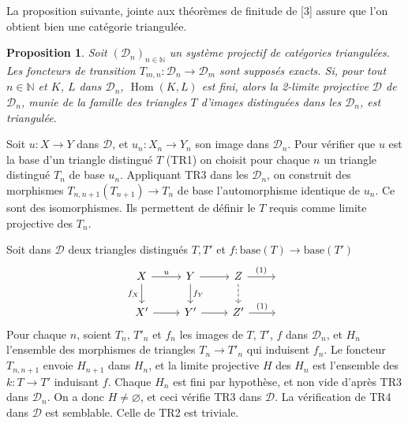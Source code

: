 \documentclass[12pt,a4paper]{article}
\theoremstyle{plain}
\newtheorem{proposition}[theorem]{Proposition}
\theoremstyle{definition}
\DeclareMathOperator{\Hom}{Hom}
\begin{document}
La proposition suivante, jointe aux th\'eor\`emes de finitude de [3] assure que l'on obtient bien une cat\'egorie triangul\'ee.

\begin{proposition}\label{prop:2.2.15}
Soit $(\mathcal{D}_n)_{n \in \mathbb{N}}$ un syst\`eme projectif de cat\'egories triangul\'ees. Les foncteurs de transition $T_{m,n} : \mathcal{D}_n \to \mathcal{D}_m$ sont suppos\'es exacts. Si, pour tout $n \in \mathbb{N}$ et $K$, $L$ dans $\mathcal{D}_n$, $\Hom(K,L)$ est fini, alors la 2-limite projective $\mathcal{D}$ de $\mathcal{D}_n$, munie de la famille des triangles $T$ d'images distingu\'ees dans les $\mathcal{D}_n$, est triangul\'ee.
\end{proposition}

Soit $u : X \to Y$ dans $\mathcal{D}$, et $u_n : X_n \to Y_n$ son image dans $\mathcal{D}_n$. Pour v\'erifier que $u$ est la base d'un triangle distingu\'e $T$ (TR1) on choisit pour chaque $n$ un triangle distingu\'e $T_n$ de base $u_n$. Appliquant TR3 dans les $\mathcal{D}_n$, on construit des morphismes $T_{n,n+1}(T_{n+1}) \to T_n$ de base l'automorphisme identique de $u_n$. Ce sont des isomorphismes. Ils permettent de d\'efinir le $T$ requis comme limite projective des $T_n$.

Soit dans $\mathcal{D}$ deux triangles distingu\'es $T, T'$ et $f : \text{base}(T) \to \text{base}(T')$
\[
\begin{tikzcd}
X \arrow[r, "u"] \arrow[d, "f_X"'] & Y \arrow[r] \arrow[d, "f_Y"] & Z \arrow[r, "{(1)}"] \arrow[d, dashed] & {} \\
X' \arrow[r] & Y' \arrow[r] & Z' \arrow[r, "{(1)}"] & {}
\end{tikzcd}
\]
Pour chaque $n$, soient $T_n$, $T'_n$ et $f_n$ les images de $T$, $T'$, $f$ dans $\mathcal{D}_n$, et $H_n$ l'ensemble des morphismes de triangles $T_n \to T'_n$ qui induisent $f_n$. Le foncteur $T_{n,n+1}$ envoie $H_{n+1}$ dans $H_n$, et la limite projective $H$ des $H_n$ est l'ensemble des $k : T \to T'$ induisant $f$. Chaque $H_n$ est fini par hypoth\`ese, et non vide d'apr\`es TR3 dans $\mathcal{D}_n$. On a donc $H \neq \varnothing$, et ceci v\'erifie TR3 dans $\mathcal{D}$. La v\'erification de TR4 dans $\mathcal{D}$ est semblable. Celle de TR2 est triviale.
\end{document}
